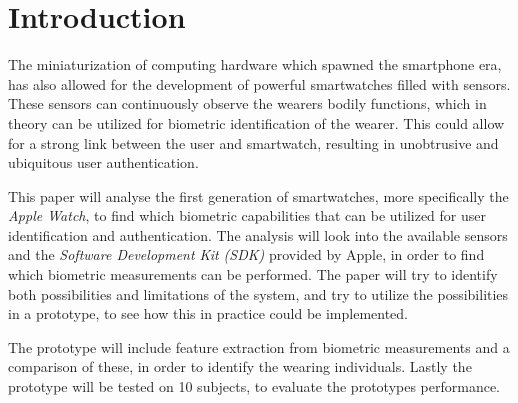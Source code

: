\section{Introduction}
The miniaturization of computing hardware which spawned the smartphone era, has also
allowed for the development of powerful smartwatches filled with sensors.
These sensors can continuously observe the wearers bodily functions, which in 
theory can be utilized for biometric identification of the wearer.
This could allow for a strong link between the user and smartwatch, resulting in
unobtrusive and ubiquitous user authentication. %

This paper will analyse the first generation of smartwatches, more specifically
the \textit{Apple Watch}, to find which biometric capabilities that can be
utilized for user identification and authentication. The analysis will look into
the available sensors and the \textit{Software Development Kit (SDK)} provided 
by Apple, in order to find which biometric measurements can be performed. The
paper will try to identify both possibilities and limitations of the system, and
try to utilize the possibilities in a prototype, to see how this in practice
could be implemented. 

The prototype will include feature extraction from
biometric measurements and a comparison of these, in order to identify the
wearing individuals. Lastly the prototype will be tested on 10 subjects, to
evaluate the prototypes performance.
